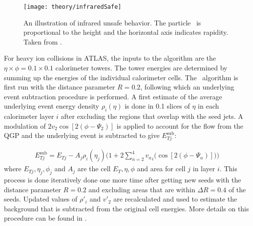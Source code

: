 \begin{figure}[htp]
\centering
\texttt{[image: theory/infraredSafe]}
\caption{An illustration of infrared unsafe behavior. The particle \pt\ is proportional to the height and the horizontal axis indicates rapidity. Taken from \cite{Salam_2007}. }
\label{fig:infraredSafe}
\end{figure}


For heavy ion collisions in ATLAS, the inputs to the algorithm are the $\eta \times \phi = 0.1 \times 0.1$ calorimeter towers. The tower energies are determined by summing up the energies of the individual calorimeter cells. The \antikt\ algorithm is first run with the distance parameter $R=0.2$, following which an underlying event subtraction procedure is performed. A first estimate of the average underlying event energy density $\rho_i (\eta)$ is done in 0.1 slices of $\eta$ in each calorimeter layer $i$ after excluding the regions that overlap with the seed jets. A modulation of $2v_{2} \cos[2(\phi-\Psi_2)] $ is applied to account for the flow from the QGP and the underlying event is subtracted to give $E_{Tj}^{\mathrm{sub}}$:

\begin{align}
E_{Tj}^{\mathrm{sub}} = E_{Tj} - A_j \rho_i (\eta_j) \Big(1+2 \sum_{n=2}^{4} {v_{n}}_i \big(\cos[2(\phi-\Psi_n)] \big) \Big)
\end{align}
where $E_{Tj} , \eta_j, \phi_j$ and $A_j$ are the cell $E_T, \eta, \phi$ and area for cell $j$ in layer $i$. This process is done iteratively done one more time after getting new seeds with the distance parameter $R = 0.2$ and excluding areas that are within $\Delta R = 0.4$ of the seeds. Updated values of $\rho{'}_i$ and $v{'}_2$ are recalculated and used to estimate the background that is subtracted from the original cell energies. More details on this procedure can be found in \cite{2013220}.



%

%
%
%
%
%
%
%
%

